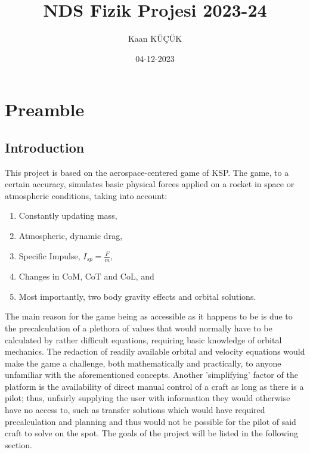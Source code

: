 \documentclass[12pt]{article}
\title{NDS Fizik Projesi 2023-24}
\date{04-12-2023}
\author{Kaan KÜÇÜK}
\begin{document}
\maketitle
\newpage
{}

\section{Preamble}

    \subsection{Introduction}
    This project is based on the aerospace-centered game of KSP. The game, to a certain accuracy, simulates basic physical forces applied on a rocket in space or atmospheric conditions, taking into account:
    \begin{enumerate}
        \item Constantly updating mass,
        \item Atmospheric, dynamic drag,
        \item Specific Impulse, $I_{sp} = \frac{F}{\dot{m}}$,
        \item Changes in CoM, CoT and CoL, and
        \item Most importantly, two body gravity effects and orbital solutions.
    \end{enumerate}
    The main reason for the game being as accessible as it happens to be is due to the precalculation of a plethora of values that would normally have to be calculated by rather difficult equations, requiring basic knowledge of orbital mechanics. The redaction of readily available orbital and velocity equations would make the game a challenge, both mathematically and practically, to anyone unfamiliar with the aforementioned concepts.
    \newline\newline
    Another 'simplifying' factor of the platform is the availability of direct manual control of a craft as long as there is a pilot; thus, unfairly supplying the user with information they would otherwise have no access to, such as transfer solutions which would have required precalculation and planning and thus would not be possible for the pilot of said craft to solve on the spot. 
    \newline\newline
    The goals of the project will be listed in the following section.
    \pagebreak
\end{document}
